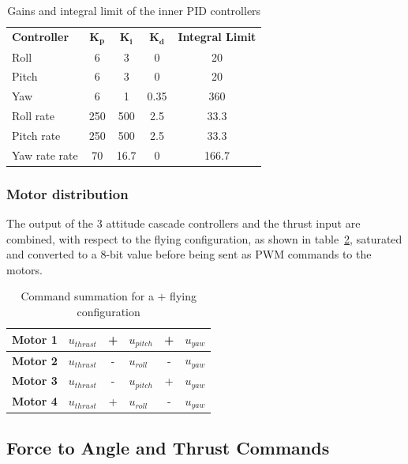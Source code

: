 \documentclass[a4paper, 12pt]{report}
\begin{document}
\begin{table}[htdp]
\caption{Gains and integral limit of the inner PID controllers}
\centering
\begin{tabular}{|l||c|c|c|c|}
\hline
\textbf{Controller} & $\boldsymbol{K_p}$ & $\boldsymbol{K_i}$ & $\boldsymbol{K_d}$ & \textbf{Integral Limit}  \\
\hhline{|=#=|=|=|=|}
Roll & 6 & 3 & 0 & 20  \\
\hline
Pitch & 6 & 3 & 0 & 20  \\
\hline
Yaw & 6 & 1 & 0.35 & 360  \\
\hline
Roll rate & 250 & 500 & 2.5 & 33.3  \\
\hline
Pitch rate & 250 & 500 & 2.5 & 33.3  \\
\hline
Yaw rate rate & 70 & 16.7 & 0 & 166.7  \\
\hline
\end{tabular}
\label{tab:controllerInnerGains}
\end{table}

\subsubsection{Motor distribution}
The output of the 3 attitude cascade controllers and the thrust input are combined, with respect to the flying configuration, as shown in table~\ref{tab:motorDistribution}, saturated and converted to a 8-bit value before being sent as PWM commands to the motors. 

\begin{table}[htdp]
\caption{Command summation for a $+$  flying configuration}
\centering
\begin{tabular}{|l|l c l c l|}
\hline
\textbf{Motor 1} & $u_{thrust}$ & + &$u_{pitch}$ & + & $u_{yaw}$\\
\hline
\hline
\textbf{Motor 2} & $u_{thrust}$ & - & $u_{roll}$ & - & $u_{yaw}$ \\
\hline
\hline
\textbf{Motor 3} & $u_{thrust}$ & - & $u_{pitch}$ & + & $u_{yaw}$\\
\hline
\hline
\textbf{Motor 4} & $u_{thrust}$ & + & $u_{roll}$ & - & $u_{yaw}$ \\
\hline
\end{tabular}
\label{tab:motorDistribution}
\end{table}

\subsection{Force to Angle and Thrust Commands}
\end{document}
